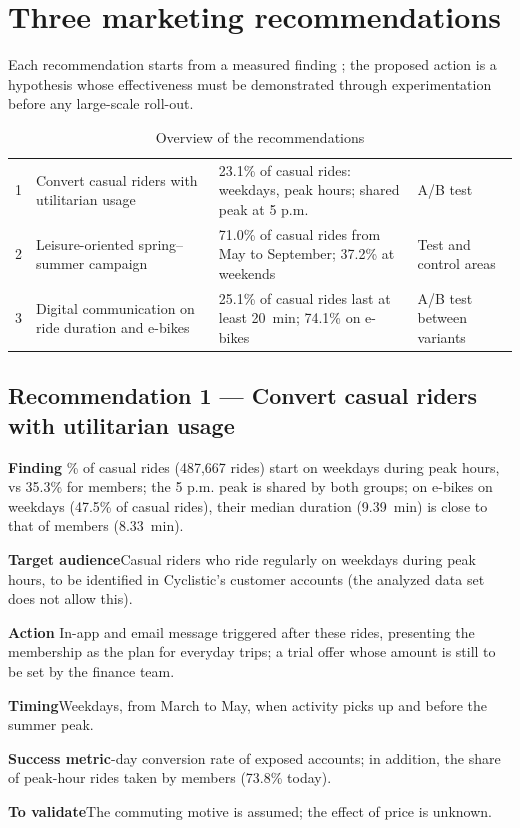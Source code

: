 \section{Three marketing recommendations}
\label{sec:recos}

Each recommendation starts from a measured finding \Mes{}; the proposed action is a hypothesis \Hyp{} whose effectiveness must be demonstrated through experimentation before any large-scale roll-out.

\begin{table}[H]
\caption{Overview of the recommendations}
\label{tab:recos}
\small
\begin{tabularx}{\linewidth}{c L{4.1cm} Y L{2.6cm}}
\toprule
\thead{\#} &  &  &  \\
 & Convert casual riders with utilitarian usage & 23.1\% of casual rides: weekdays, peak hours; shared peak at 5 p.m. & A/B test \\
2 & Leisure-oriented spring--summer campaign & 71.0\% of casual rides from May to September; 37.2\% at weekends & Test and control areas \\
3 & Digital communication on ride duration and e-bikes & 25.1\% of casual rides last at least 20~min; 74.1\% on e-bikes & A/B test between variants \\
\bottomrule
\end{tabularx}
\end{table}

\newcommand{\recoline}[2]{\textbf{#1}\quad #2\par\smallskip}

\subsection{Recommendation 1 — Convert casual riders with utilitarian usage}
\recoline{Finding \Mes}{23.1\% of casual rides (487,667 rides) start on weekdays during peak hours, vs 35.3\% for members; the 5 p.m. peak is shared by both groups; on e-bikes on weekdays (47.5\% of casual rides), their median duration (9.39~min) is close to that of members (8.33~min).}
\recoline{Target audience}{Casual riders who ride regularly on weekdays during peak hours, to be identified in Cyclistic's customer accounts (the analyzed data set does not allow this).}
\recoline{Action \Hyp}{In-app and email message triggered after these rides, presenting the membership as the plan for everyday trips; a trial offer whose amount is still to be set by the finance team.}
\recoline{Timing}{Weekdays, from March to May, when activity picks up and before the summer peak.}
\recoline{Success metric}{60-day conversion rate of exposed accounts; in addition, the share of peak-hour rides taken by members (73.8\% today).}
\recoline{To validate}{The commuting motive is assumed; the effect of price is unknown.}

